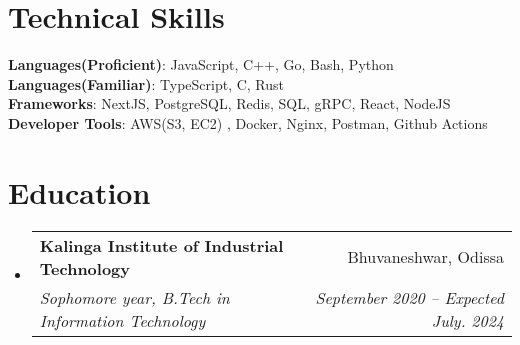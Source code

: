 \documentclass[letterpaper,11pt]{article}
\makeatletter
\newcommand{\resumeSubheading}[4]{
  \vspace{-2pt}\item
    \begin{tabular*}{0.97\textwidth}[t]{l@{\extracolsep{\fill}}r}
      \textbf{#1} & #2 \\
      \textit{\small#3} & \textit{\small #4} \\
    \end{tabular*}\vspace{-7pt}
}
\newcommand{\resumeSubHeadingListStart}{\begin{itemize}[leftmargin=0.15in, label={}]}
\newcommand{\resumeSubHeadingListEnd}{\end{itemize}}
\makeatother
\begin{document}
%
\section{Technical Skills}
 \begin{itemize}[leftmargin=0.15in, label={}]
    \small{\item{
     \textbf{Languages(Proficient)}{: JavaScript, C++, Go, Bash, Python } \\
      \textbf{Languages(Familiar)}{: TypeScript, C, Rust } \\
     \textbf{Frameworks}{: NextJS, PostgreSQL, Redis, SQL, gRPC, React, NodeJS  } \\
     \textbf{Developer Tools}{: AWS(S3, EC2) , Docker, Nginx, Postman, Github Actions } \\
    }}
 \end{itemize}
 
\section{Education}
  \resumeSubHeadingListStart
    \resumeSubheading
      {Kalinga Institute of Industrial Technology}{Bhuvaneshwar, Odissa}
      {Sophomore year, B.Tech in Information Technology}{September 2020 -- Expected July. 2024}
  \resumeSubHeadingListEnd
\end{document}
